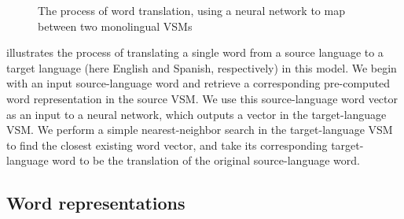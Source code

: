 \documentclass[11pt]{article}
\begin{document}
\begin{figure}[tb!]
	\centering
    \caption{The process of word translation, using a neural network to map
      between two monolingual VSMs}
    \label{fig:translation}
\end{figure}

 illustrates the process of translating a single word from
a source language to a target language (here English and Spanish, respectively)
in this model. We begin with an input source-language word and retrieve a
corresponding pre-computed word representation in the source VSM\@. We use this
source-language word vector as an input to a neural network, which outputs a
vector in the target-language VSM\@. We perform a simple nearest-neighbor search
in the target-language VSM to find the closest existing word vector, and take
its corresponding target-language word to be the translation of the original
source-language word.

\subsection{Word representations}
\label{subsec:word-representations}
\end{document}
